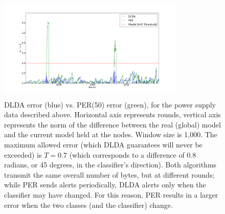 \begin{figure}[H]
	\centering
	\includegraphics[width=3.5in,height=2in]{graphics/PERvsDLDAonPowerSupply.png}
	\caption{DLDA error (blue) vs. PER(50) error (green), for the power supply
	data described above. Horizontal axis represents rounds, vertical
	axis represents the norm of the difference between the real (global) model and the current model held at the nodes. Window size is 1,000.
	The maximum allowed error (which DLDA guarantees will never be
	exceeded) is $T = 0.7$ (which corresponds to a difference of
	0.8 radians, or 45 degrees, in the classifier's direction). Both
	algorithms transmit the same overall number of bytes, but at different
	rounds; while PER sends alerts periodically, DLDA alerts only when the classifier may have changed. For this reason, PER results in a larger
	error when the two classes (and the classifier) change. }
	\label{PERvsDLDAonPowerSupply}
	\end{figure}

